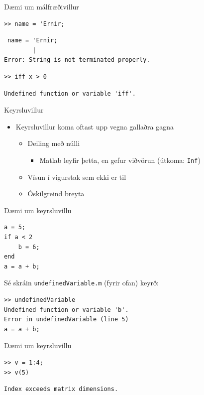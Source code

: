 \documentclass{beamer}
\begin{document}
\begin{frame}[fragile]{Dæmi um málfræðivillur}
\begin{verbatim}
>> name = 'Ernir;
\end{verbatim}
\pause
\begin{verbatim}
 name = 'Ernir;
        |
Error: String is not terminated properly.
\end{verbatim}
\pause
\begin{verbatim}
>> iff x > 0
\end{verbatim}
\pause
\begin{verbatim}
Undefined function or variable 'iff'. 
\end{verbatim}
\end{frame}

\begin{frame}{Keyrsluvillur}
\begin{itemize}
 \item Keyrsluvillur koma oftast upp vegna gallaðra gagna
 \begin{itemize}
  \item  Deiling með núlli
  \begin{itemize}
   \item Matlab leyfir þetta, en gefur viðvörun (útkoma: \texttt{Inf})
  \end{itemize}
  \item Vísun í vigurstak sem ekki er til
  \item Óskilgreind breyta
 \end{itemize}
\end{itemize}
\end{frame}

\begin{frame}[fragile]{Dæmi um keyrsluvillu}
\vspace{\baselineskip}
\begin{verbatim}
a = 5;
if a < 2
    b = 6;
end
a = a + b;
\end{verbatim}
\pause
Sé skráin \texttt{undefinedVariable.m} (fyrir ofan) keyrð:
\begin{verbatim}
>> undefinedVariable
Undefined function or variable 'b'.
Error in undefinedVariable (line 5)
a = a + b; 
\end{verbatim}
\end{frame}

\begin{frame}[fragile]{Dæmi um keyrsluvillu}
\begin{verbatim}
>> v = 1:4;
>> v(5)
\end{verbatim}
\pause
\begin{verbatim}
Index exceeds matrix dimensions.
\end{verbatim}
\end{frame}
\end{document}
